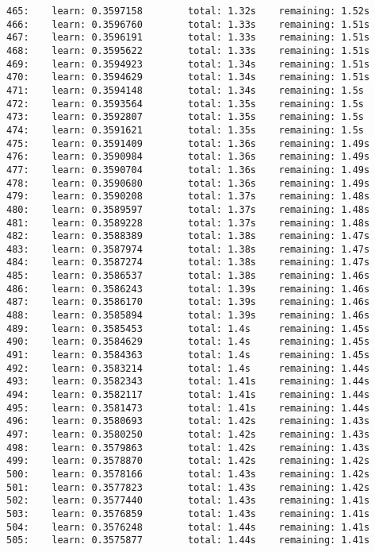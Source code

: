 \documentclass[11pt]{article}
\begin{document}
\begin{Verbatim}[commandchars=\\\{\}]
465:    learn: 0.3597158        total: 1.32s    remaining: 1.52s
466:    learn: 0.3596760        total: 1.33s    remaining: 1.51s
467:    learn: 0.3596191        total: 1.33s    remaining: 1.51s
468:    learn: 0.3595622        total: 1.33s    remaining: 1.51s
469:    learn: 0.3594923        total: 1.34s    remaining: 1.51s
470:    learn: 0.3594629        total: 1.34s    remaining: 1.51s
471:    learn: 0.3594148        total: 1.34s    remaining: 1.5s
472:    learn: 0.3593564        total: 1.35s    remaining: 1.5s
473:    learn: 0.3592807        total: 1.35s    remaining: 1.5s
474:    learn: 0.3591621        total: 1.35s    remaining: 1.5s
475:    learn: 0.3591409        total: 1.36s    remaining: 1.49s
476:    learn: 0.3590984        total: 1.36s    remaining: 1.49s
477:    learn: 0.3590704        total: 1.36s    remaining: 1.49s
478:    learn: 0.3590680        total: 1.36s    remaining: 1.49s
479:    learn: 0.3590208        total: 1.37s    remaining: 1.48s
480:    learn: 0.3589597        total: 1.37s    remaining: 1.48s
481:    learn: 0.3589228        total: 1.37s    remaining: 1.48s
482:    learn: 0.3588389        total: 1.38s    remaining: 1.47s
483:    learn: 0.3587974        total: 1.38s    remaining: 1.47s
484:    learn: 0.3587274        total: 1.38s    remaining: 1.47s
485:    learn: 0.3586537        total: 1.38s    remaining: 1.46s
486:    learn: 0.3586243        total: 1.39s    remaining: 1.46s
487:    learn: 0.3586170        total: 1.39s    remaining: 1.46s
488:    learn: 0.3585894        total: 1.39s    remaining: 1.46s
489:    learn: 0.3585453        total: 1.4s     remaining: 1.45s
490:    learn: 0.3584629        total: 1.4s     remaining: 1.45s
491:    learn: 0.3584363        total: 1.4s     remaining: 1.45s
492:    learn: 0.3583214        total: 1.4s     remaining: 1.44s
493:    learn: 0.3582343        total: 1.41s    remaining: 1.44s
494:    learn: 0.3582117        total: 1.41s    remaining: 1.44s
495:    learn: 0.3581473        total: 1.41s    remaining: 1.44s
496:    learn: 0.3580693        total: 1.42s    remaining: 1.43s
497:    learn: 0.3580250        total: 1.42s    remaining: 1.43s
498:    learn: 0.3579863        total: 1.42s    remaining: 1.43s
499:    learn: 0.3578870        total: 1.42s    remaining: 1.42s
500:    learn: 0.3578166        total: 1.43s    remaining: 1.42s
501:    learn: 0.3577823        total: 1.43s    remaining: 1.42s
502:    learn: 0.3577440        total: 1.43s    remaining: 1.41s
503:    learn: 0.3576859        total: 1.43s    remaining: 1.41s
504:    learn: 0.3576248        total: 1.44s    remaining: 1.41s
505:    learn: 0.3575877        total: 1.44s    remaining: 1.41s

\end{Verbatim}
\end{document}
